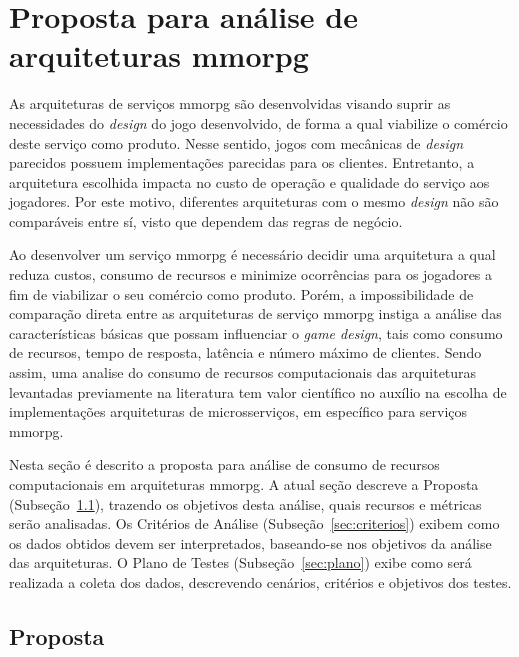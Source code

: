 \chapter{Proposta para análise de arquiteturas \ac{mmorpg}}
\label{cap3}



As arquiteturas de serviços \ac{mmorpg} são desenvolvidas visando suprir as necessidades do \textit{design} do jogo desenvolvido, de forma a qual viabilize o comércio deste serviço como produto.
%
Nesse sentido, jogos com mecânicas de \textit{design} parecidos possuem implementações parecidas para os clientes.
%
Entretanto, a arquitetura escolhida impacta no custo de operação e qualidade do serviço aos jogadores.
%
Por este motivo, diferentes arquiteturas com o mesmo \textit{design} não são comparáveis entre sí, visto que dependem das regras de negócio.



Ao desenvolver um serviço \ac{mmorpg} é necessário decidir uma arquitetura a qual reduza custos, consumo de recursos e minimize ocorrências para os jogadores a fim de viabilizar o seu comércio como produto.
%
Porém, a impossibilidade de comparação direta entre as arquiteturas de serviço \ac{mmorpg} instiga a análise das características básicas que possam influenciar o \textit{game design}, tais como consumo de recursos, tempo de resposta, latência e número máximo de clientes.
%
Sendo assim, uma analise do consumo de recursos computacionais das arquiteturas levantadas previamente na literatura tem valor científico no auxílio na escolha de implementações arquiteturas de microsserviços, em específico para serviços \ac{mmorpg}.



Nesta seção é descrito a proposta para análise de consumo de recursos computacionais em arquiteturas \ac{mmorpg}.
%
A atual seção descreve a Proposta (Subseção~\ref{sec:proposta}), trazendo os objetivos desta análise, quais recursos e métricas serão analisadas.
%
Os Critérios de Análise (Subseção~\ref{sec:criterios}) exibem como os dados obtidos devem ser interpretados, baseando-se nos objetivos da análise das arquiteturas.
%
O Plano de Testes (Subseção~\ref{sec:plano}) exibe como será realizada a coleta dos dados, descrevendo cenários, critérios e objetivos dos testes.



\section{Proposta}
\label{sec:proposta}

